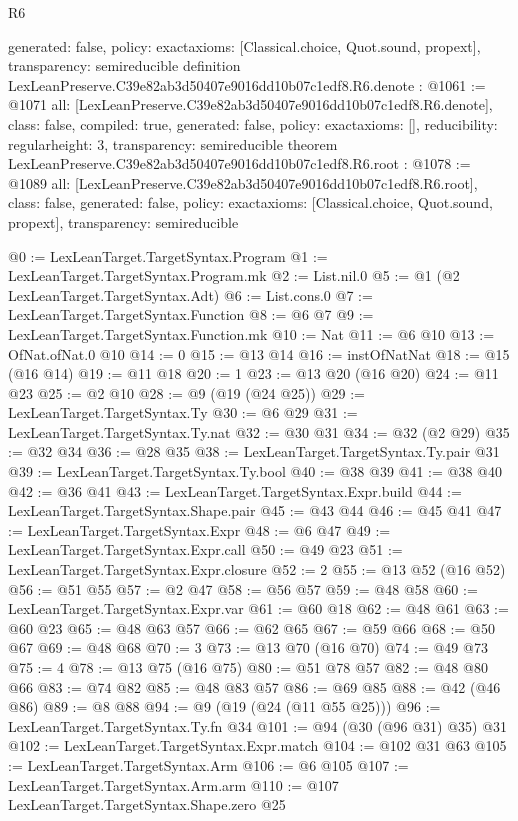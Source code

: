 \begin{lexlean}{R6}
\begin{coremodule}
{  generated: false,
  policy: exact{axioms: [Classical.choice, Quot.sound, propext]},
  transparency: semireducible
}
definition LexLeanPreserve.C39e82ab3d50407e9016dd10b07c1edf8.R6.denote : @1061 := @1071 {
  all: [LexLeanPreserve.C39e82ab3d50407e9016dd10b07c1edf8.R6.denote],
  class: false,
  compiled: true,
  generated: false,
  policy: exact{axioms: []},
  reducibility: regular{height: 3},
  transparency: semireducible
}
theorem LexLeanPreserve.C39e82ab3d50407e9016dd10b07c1edf8.R6.root : @1078 := @1089 {
  all: [LexLeanPreserve.C39e82ab3d50407e9016dd10b07c1edf8.R6.root],
  class: false,
  generated: false,
  policy: exact{axioms: [Classical.choice, Quot.sound, propext]},
  transparency: semireducible
}

@0 := LexLeanTarget.TargetSyntax.Program
@1 := LexLeanTarget.TargetSyntax.Program.mk
@2 := List.nil.{0}
@5 := @1 (@2 LexLeanTarget.TargetSyntax.Adt)
@6 := List.cons.{0}
@7 := LexLeanTarget.TargetSyntax.Function
@8 := @6 @7
@9 := LexLeanTarget.TargetSyntax.Function.mk
@10 := Nat
@11 := @6 @10
@13 := OfNat.ofNat.{0} @10
@14 := 0
@15 := @13 @14
@16 := instOfNatNat
@18 := @15 (@16 @14)
@19 := @11 @18
@20 := 1
@23 := @13 @20 (@16 @20)
@24 := @11 @23
@25 := @2 @10
@28 := @9 (@19 (@24 @25))
@29 := LexLeanTarget.TargetSyntax.Ty
@30 := @6 @29
@31 := LexLeanTarget.TargetSyntax.Ty.nat
@32 := @30 @31
@34 := @32 (@2 @29)
@35 := @32 @34
@36 := @28 @35
@38 := LexLeanTarget.TargetSyntax.Ty.pair @31
@39 := LexLeanTarget.TargetSyntax.Ty.bool
@40 := @38 @39
@41 := @38 @40
@42 := @36 @41
@43 := LexLeanTarget.TargetSyntax.Expr.build
@44 := LexLeanTarget.TargetSyntax.Shape.pair
@45 := @43 @44
@46 := @45 @41
@47 := LexLeanTarget.TargetSyntax.Expr
@48 := @6 @47
@49 := LexLeanTarget.TargetSyntax.Expr.call
@50 := @49 @23
@51 := LexLeanTarget.TargetSyntax.Expr.closure
@52 := 2
@55 := @13 @52 (@16 @52)
@56 := @51 @55
@57 := @2 @47
@58 := @56 @57
@59 := @48 @58
@60 := LexLeanTarget.TargetSyntax.Expr.var
@61 := @60 @18
@62 := @48 @61
@63 := @60 @23
@65 := @48 @63 @57
@66 := @62 @65
@67 := @59 @66
@68 := @50 @67
@69 := @48 @68
@70 := 3
@73 := @13 @70 (@16 @70)
@74 := @49 @73
@75 := 4
@78 := @13 @75 (@16 @75)
@80 := @51 @78 @57
@82 := @48 @80 @66
@83 := @74 @82
@85 := @48 @83 @57
@86 := @69 @85
@88 := @42 (@46 @86)
@89 := @8 @88
@94 := @9 (@19 (@24 (@11 @55 @25)))
@96 := LexLeanTarget.TargetSyntax.Ty.fn @34
@101 := @94 (@30 (@96 @31) @35) @31
@102 := LexLeanTarget.TargetSyntax.Expr.match
@104 := @102 @31 @63
@105 := LexLeanTarget.TargetSyntax.Arm
@106 := @6 @105
@107 := LexLeanTarget.TargetSyntax.Arm.arm
@110 := @107 LexLeanTarget.TargetSyntax.Shape.zero @25

\end{coremodule}
\end{lexlean}
